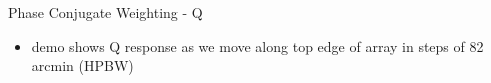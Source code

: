 \documentclass[pdf,azure,slideColor,colorBG]{prosper}
\begin{document}
\begin{slide}{Phase Conjugate Weighting - Q}
\begin{small}
\begin{itemize}
\item demo shows Q response as we move along top edge of array in steps of 82 arcmin (HPBW)
\end{itemize}
\end {small}
{\centering
{}
}
\end{slide}
\end{document}
